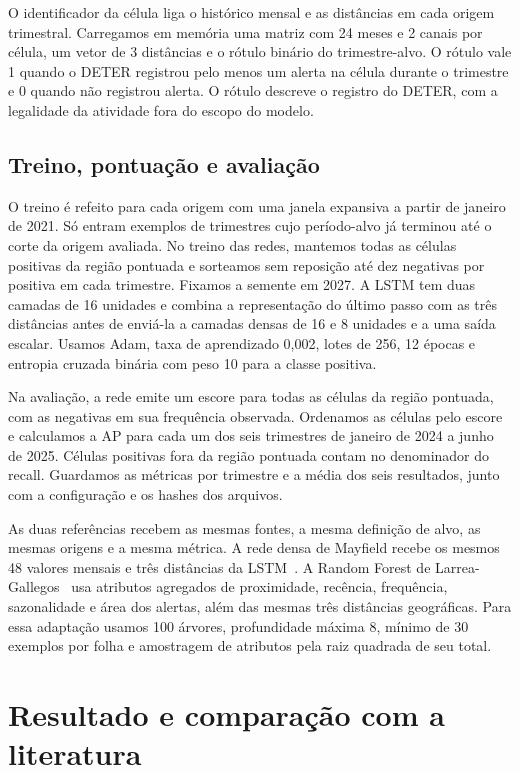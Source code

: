 \documentclass[a4paper,conference]{IEEEtran}
\begin{document}
O identificador da célula liga o histórico mensal e as distâncias em cada origem trimestral. Carregamos em memória uma matriz com 24 meses e 2 canais por célula, um vetor de 3 distâncias e o rótulo binário do trimestre-alvo. O rótulo vale 1 quando o DETER registrou pelo menos um alerta na célula durante o trimestre e 0 quando não registrou alerta. O rótulo descreve o registro do DETER, com a legalidade da atividade fora do escopo do modelo.

\subsection{Treino, pontuação e avaliação}

O treino é refeito para cada origem com uma janela expansiva a partir de janeiro de 2021. Só entram exemplos de trimestres cujo período-alvo já terminou até o corte da origem avaliada. No treino das redes, mantemos todas as células positivas da região pontuada e sorteamos sem reposição até dez negativas por positiva em cada trimestre. Fixamos a semente em 2027. A LSTM tem duas camadas de 16 unidades e combina a representação do último passo com as três distâncias antes de enviá-la a camadas densas de 16 e 8 unidades e a uma saída escalar. Usamos Adam, taxa de aprendizado 0,002, lotes de 256, 12 épocas e entropia cruzada binária com peso 10 para a classe positiva.

Na avaliação, a rede emite um escore para todas as células da região pontuada, com as negativas em sua frequência observada. Ordenamos as células pelo escore e calculamos a AP para cada um dos seis trimestres de janeiro de 2024 a junho de 2025. Células positivas fora da região pontuada contam no denominador do recall. Guardamos as métricas por trimestre e a média dos seis resultados, junto com a configuração e os hashes dos arquivos.

As duas referências recebem as mesmas fontes, a mesma definição de alvo, as mesmas origens e a mesma métrica. A rede densa de Mayfield recebe os mesmos 48 valores mensais e três distâncias da LSTM~\cite{mayfield2020}. A Random Forest de Larrea-Gallegos~\cite{larrea2023} usa atributos agregados de proximidade, recência, frequência, sazonalidade e área dos alertas, além das mesmas três distâncias geográficas. Para essa adaptação usamos 100 árvores, profundidade máxima 8, mínimo de 30 exemplos por folha e amostragem de atributos pela raiz quadrada de seu total.

\section{Resultado e comparação com a literatura}
\end{document}
